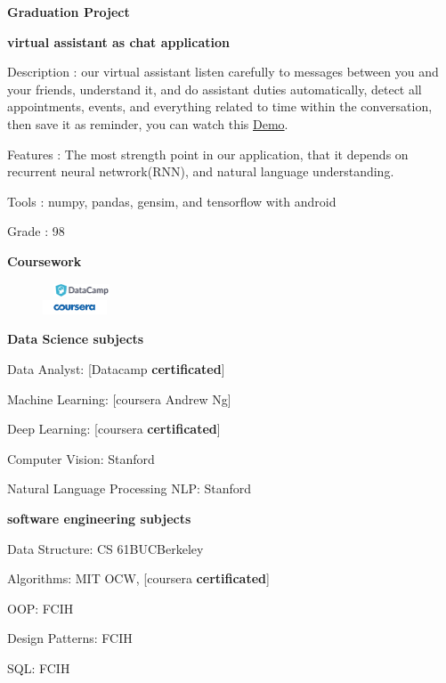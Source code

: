 \documentclass[a4paper,13pt,final]{memoir}
\newcommand{\Sep}{\vspace{1.5em}}
\newcommand{\SmallSep}{\vspace{0.5em}}
\newcommand{\CVSection}[1]
	{\Large\textbf{#1}\par
	\SmallSep\normalsize\normalfont}
\newcommand{\CVItem}[1]
	{\textbf{\color{RoyalBlue} #1}}
\begin{document}
\CVSection{Graduation Project}
\CVItem{virtual assistant as chat application}
\begin{compactitem}[\color{RoyalBlue}$\circ$]
		\item Description : our virtual assistant listen carefully to messages between you and your friends, understand it, and do assistant duties automatically, detect all appointments, events, and everything related to time within the conversation, then save it as reminder, you can watch this \href{https://www.youtube.com/watch?v=ZH4_8P6gTI8}{Demo}.
		\item Features : The most strength point in our application, that it depends on recurrent neural netwrork(RNN), and natural language understanding.
		\item Tools : numpy, pandas, gensim, and tensorflow with android
		\item Grade : 98
	\end{compactitem}
\SmallSep
\Sep

\CVSection{Coursework}

\begin{figure}
\ \raggedleft
\includegraphics[width=0.15\textwidth]{DataCamp} \\
\includegraphics[width=0.17\textwidth]{Coursera}\\
\end{figure}

\CVItem{Data Science subjects}
\begin{compactitem}[\color{RoyalBlue}$\circ$]
	\item Data Analyst: [Datacamp \textbf{certificated}]
	\item Machine Learning: [coursera Andrew Ng]
	\item Deep Learning: [coursera \textbf{certificated}]
	\item Computer Vision: Stanford
	\item Natural Language Processing NLP: Stanford
\end{compactitem}
\SmallSep

\CVItem{software engineering subjects}
\begin{compactitem}[\color{RoyalBlue}$\circ$]
	\item Data Structure: CS 61BUCBerkeley
	\item Algorithms: MIT OCW, [coursera \textbf{certificated}]
	\item OOP: FCIH
	\item Design Patterns: FCIH
	\item SQL: FCIH
\end{compactitem}
\SmallSep
\end{document}
